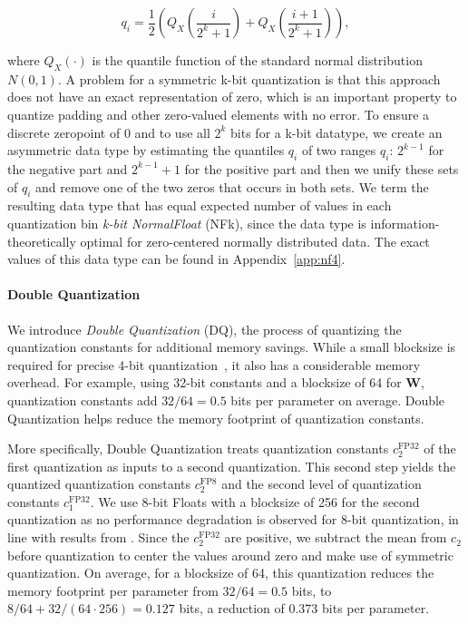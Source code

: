 \begin{equation}
q_i  = \frac{1}{2}\left( Q_X\left(\frac{i}{2^k+1}\right) + Q_X\left(\frac{i+1}{2^k+1}\right)\right),
\end{equation}

where $Q_X(\cdot)$ is the quantile function of the standard normal distribution $N(0,1)$. A problem for a symmetric k-bit quantization is that this approach does not have an exact representation of zero, which is an important property to quantize padding and other zero-valued elements with no error. To ensure a discrete zeropoint of $0$ and to use all $2^k$ bits for a k-bit datatype, we create an asymmetric data type by estimating the quantiles $q_i$ of two ranges $q_i$: $2^{k-1}$ for the negative part and $2^{k-1}+1$ for the positive part and then we unify these sets of $q_i$ and remove one of the two zeros that occurs in both sets. We term the resulting data type that has equal expected number of values in each quantization bin \emph{k-bit NormalFloat} (NFk), since the data type is information-theoretically optimal for zero-centered normally distributed data. The exact values of this data type can be found in Appendix~\ref{app:nf4}.

\paragraph{Double Quantization{}} We introduce \emph{Double Quantization} (DQ), the process of quantizing the quantization constants for additional memory savings. While a small blocksize is required for precise 4-bit quantization~\citep{dettmers2022case}, it also has a considerable memory overhead. For example, using 32-bit constants and a blocksize of 64 for $\mathbf{W}$, quantization constants add $32/64 = 0.5$ bits per parameter on average. Double Quantization helps reduce the memory footprint of quantization constants.

More specifically, Double Quantization treats quantization constants $c_2^{\text{FP32}}$ of the first quantization as inputs to a second quantization. This second step yields the quantized quantization constants $c_2^{\text{FP8}}$ and the second level of quantization constants $c_1^{\text{FP32}}$. We use 8-bit Floats with a blocksize of 256 for the second quantization as no performance degradation is observed for 8-bit quantization, in line with results from \citet{dettmers2022case}. 
Since the $c_2^{\text{FP32}}$ are positive, we subtract the mean from $c_2$ before quantization to center the values around zero and make use of symmetric quantization. On average, for a blocksize of 64, this quantization reduces the memory footprint per parameter from $32/64=0.5$ bits, to $8/64 + 32/(64\cdot256) = 0.127$ bits, a reduction of 0.373 bits per parameter. 

